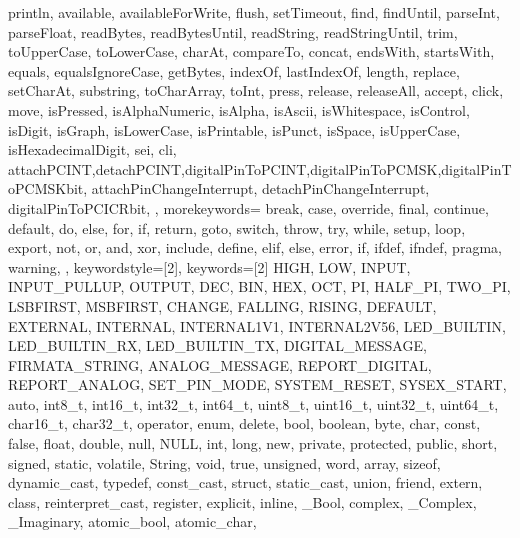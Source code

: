 {{                println, available, availableForWrite, flush, setTimeout, find, 
                findUntil, parseInt, parseFloat, readBytes, readBytesUntil, readString, 
                readStringUntil, trim, toUpperCase, toLowerCase, charAt, compareTo, 
                concat, endsWith, startsWith, equals, equalsIgnoreCase, getBytes, 
                indexOf, lastIndexOf, length, replace, setCharAt, substring, 
                toCharArray, toInt, press, release, releaseAll, accept, click, move, 
                isPressed, isAlphaNumeric, isAlpha, isAscii, isWhitespace, isControl, 
                isDigit, isGraph, isLowerCase, isPrintable, isPunct, isSpace, 
                isUpperCase, isHexadecimalDigit, sei, cli,
                attachPCINT,detachPCINT,digitalPinToPCINT,digitalPinToPCMSK,digitalPinToPCMSKbit,
                attachPinChangeInterrupt, detachPinChangeInterrupt,
                digitalPinToPCICRbit,
                }, 
  morekeywords={   %
                break, case, override, final, continue, default, do, else, for, 
                if, return, goto, switch, throw, try, while, setup, loop, export, 
                not, or, and, xor, include, define, elif, else, error, if, ifdef, 
                ifndef, pragma, warning,
                }, 
% 
%
  keywordstyle=[2]\color{arduinoBlue},   
  keywords=[2]{   %
                HIGH, LOW, INPUT, INPUT_PULLUP, OUTPUT, DEC, BIN, HEX, OCT, PI, 
                HALF_PI, TWO_PI, LSBFIRST, MSBFIRST, CHANGE, FALLING, RISING, 
                DEFAULT, EXTERNAL, INTERNAL, INTERNAL1V1, INTERNAL2V56, LED_BUILTIN, 
                LED_BUILTIN_RX, LED_BUILTIN_TX, DIGITAL_MESSAGE, FIRMATA_STRING, 
                ANALOG_MESSAGE, REPORT_DIGITAL, REPORT_ANALOG, SET_PIN_MODE, 
                SYSTEM_RESET, SYSEX_START, auto, int8_t, int16_t, int32_t, int64_t, 
                uint8_t, uint16_t, uint32_t, uint64_t, char16_t, char32_t, operator, 
                enum, delete, bool, boolean, byte, char, const, false, float, double, 
                null, NULL, int, long, new, private, protected, public, short, 
                signed, static, volatile, String, void, true, unsigned, word, array, 
                sizeof, dynamic_cast, typedef, const_cast, struct, static_cast, union, 
                friend, extern, class, reinterpret_cast, register, explicit, inline, 
                _Bool, complex, _Complex, _Imaginary, atomic_bool, atomic_char, 
}}
